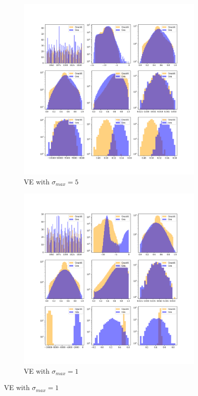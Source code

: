 \begin{figure}[htbp]
    \vspace{0.4em} %
    
    \begin{subfigure}[b]{0.4\textwidth}
        \includegraphics[width=\textwidth]{Figures/ve_5.png}
        \caption{VE with $\sigma_{max} = 5$}
        \label{fig:ve_5}
    \end{subfigure}
    \hspace{0.015\textwidth} %
    \begin{subfigure}[b]{0.4\textwidth}
        \includegraphics[width=\textwidth]{Figures/ve_1.png}
        \caption{VE with $\sigma_{max} = 1$}
        \label{fig:ve_1}
    \end{subfigure}
    

\end{figure}
